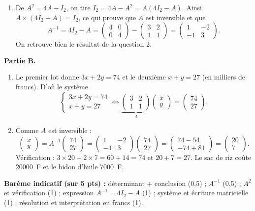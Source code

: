 \documentclass[11pt]{article}
\begin{document}
\begin{corrige}
\begin{enumerate}
\item De $A^2=4A-I_2$, on tire $I_2=4A-A^2=A(4I_2-A)$. Ainsi $A\times(4I_2-A)=I_2$, ce qui prouve que $A$ est inversible et que
\[ A^{-1}=4I_2-A=\begin{pmatrix} 4 & 0 \\ 0 & 4 \end{pmatrix}-\begin{pmatrix} 3 & 2 \\ 1 & 1 \end{pmatrix}=\begin{pmatrix} 1 & -2 \\ -1 & 3 \end{pmatrix}. \]
On retrouve bien le résultat de la question 2.
\end{enumerate}
\textbf{Partie B.}
\begin{enumerate}
\item Le premier lot donne $3x+2y=74$ et le deuxième $x+y=27$ (en milliers de francs). D'où le système
\[ \begin{cases} 3x+2y=74 \\ x+y=27 \end{cases}\iff \underbrace{\begin{pmatrix} 3 & 2 \\ 1 & 1 \end{pmatrix}}_{A}\begin{pmatrix} x \\ y \end{pmatrix}=\begin{pmatrix} 74 \\ 27 \end{pmatrix}. \]

\item Comme $A$ est inversible :
\[ \begin{pmatrix} x \\ y \end{pmatrix}=A^{-1}\begin{pmatrix} 74 \\ 27 \end{pmatrix}=\begin{pmatrix} 1 & -2 \\ -1 & 3 \end{pmatrix}\begin{pmatrix} 74 \\ 27 \end{pmatrix}=\begin{pmatrix} 74-54 \\ -74+81 \end{pmatrix}=\begin{pmatrix} 20 \\ 7 \end{pmatrix}. \]
Vérification : $3\times20+2\times7=60+14=74$ et $20+7=27$. Le sac de riz coûte \SI{20000}{F} et le bidon d'huile \SI{7000}{F}.
\end{enumerate}
\textbf{Barème indicatif (sur 5 pts) :} déterminant + conclusion (0,5) ; $A^{-1}$ (0,5) ; $A^2$ et vérification (1) ; expression $A^{-1}=4I_2-A$ (1) ; système et écriture matricielle (1) ; résolution et interprétation en francs (1).


\end{corrige}
\end{document}

